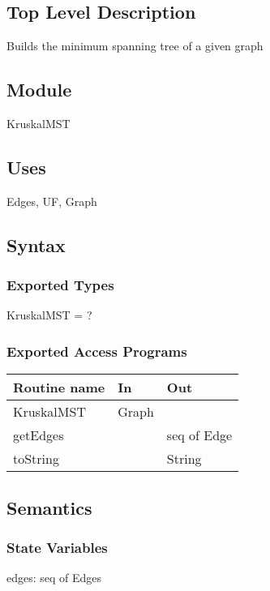 \documentclass[12pt]{article}
\begin{document}
\subsection* {Top Level Description}

Builds the minimum spanning tree of a given graph

\subsection*{Module}

KruskalMST

\subsection* {Uses}

Edges, UF, Graph

\subsection* {Syntax}

\subsubsection* {Exported Types}

KruskalMST = ?

\subsubsection* {Exported Access Programs}

\begin{tabular}{| l | l | l |}
\hline
\textbf{Routine name} & \textbf{In} & \textbf{Out}\\
\hline
KruskalMST & Graph & ~ \\
\hline
getEdges & ~ & seq of Edge \\
\hline
toString & ~ & String\\
\hline
\end{tabular}

\subsection* {Semantics}

\subsubsection* {State Variables}

edges: seq of Edges
\end{document}
